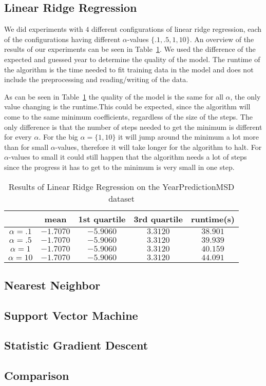 \subsection{Linear Ridge Regression}
We did experiments with $4$ different configurations of linear ridge regression, each of the configurations having different $\alpha$-values $\{.1,.5,1,10\}$. An overview of the results of our experiments can be seen in Table~\ref{ypmsd:table:lrrresults}. We used the difference of the expected and guessed year to determine the quality of the model. The runtime of the algorithm is the time needed to fit training data in the model and does not include the preprocessing and reading/writing of the data.\par
As can be seen in Table~\ref{ypmsd:table:lrrresults} the quality of the model is the same for all $\alpha$, the only value changing is the runtime.This could be expected, since the algorithm will come to the same minimum coefficients, regardless of the size of the steps. The only difference is that the number of steps needed to get the minimum is different for every $\alpha$. For the big $\alpha=\{1,10\}$ it will jump around the minimum a lot more than for small $\alpha$-values, therefore it will take longer for the algorithm to halt. For $\alpha$-values to small it could still happen that the algorithm needs a lot of steps since the progress it has to get to the minimum is very small in one step.
\begin{table}[p]
	\begin{center}
\begin{tabular}{|c|c|c|c|c|}
\hline	&mean&1st quartile&3rd quartile&runtime(s)\\
\hline$\alpha=.1$&$-1.7070$&$-5.9060$&$3.3120$&$38.901$\\
\hline$\alpha=.5$&$-1.7070$&$-5.9060$&$3.3120$&$39.939$\\
\hline$\alpha=1$&$-1.7070$&$-5.9060$&$3.3120$&$40.159$\\
\hline$\alpha=10$&$-1.7070$&$-5.9060$&$3.3120$&$44.091$\\
\end{tabular}
\end{center}
\caption{Results of Linear Ridge Regression on the YearPredictionMSD dataset\label{ypmsd:table:lrrresults}}
\end{table}
\subsection{Nearest Neighbor}
\subsection{Support Vector Machine}
\subsection{Statistic Gradient Descent}

\subsection{Comparison}

